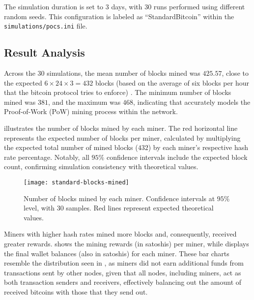 The simulation duration is set to 3 days, with 30 runs performed using
different random seeds. This configuration is labeled as ``StandardBitcoin''
within the \texttt{simulations/pocs.ini} file.

\subsection{Result Analysis}\label{subsec:general-analysis}

Across the 30 simulations, the mean number of blocks mined was \(425.57\),
close to the expected \(6 \times 24 \times 3 = 432\) blocks (based on the
average of six blocks per hour that the bitcoin protocol tries to enforce)
\cite[Chapter~``Difficulty'']{learnmeabitcoin}. The minimum number of blocks
mined was \(381\), and the maximum was \(468\), indicating that \iblock{}
accurately models the Proof-of-Work (PoW) mining process within the network.

 illustrates the number of blocks mined by
each miner. The red horizontal line represents the expected number of blocks
per miner, calculated by multiplying the expected total number of mined blocks
(\(432\)) by each miner’s respective hash rate percentage. Notably, all
\(95\%\) confidence intervals include the expected block count, confirming
simulation consistency with theoretical values.

\begin{figure}[tbhp]
	\centering
	\texttt{[image: standard-blocks-mined]}
	\caption{Number of blocks mined by each miner. Confidence intervals at
	\(95\%\) level, with 30 samples. Red lines represent expected
	theoretical values.}\label{fig:general-blocks-mined}
\end{figure}

Miners with higher hash rates mined more blocks and, consequently, received
greater rewards.  shows the mining rewards (in
satoshis) per miner, while  displays the final
wallet balances (also in satoshis) for each miner. These bar charts resemble
the distribution seen in , as miners did not
earn additional funds from transactions sent by other nodes, given that all
nodes, including miners, act as both transaction senders and receivers,
effectively balancing out the amount of received bitcoins with those that they
send out.


